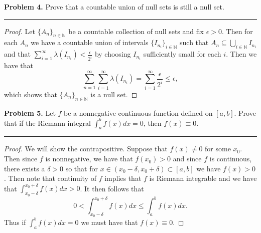 \documentclass[leqno]{article}
\theoremstyle{nonumberplain}
\newtheorem{proof}{Proof}
\newcommand{\N}{\mathbb{N}}
\begin{document}
\pagebreak




\noindent\textbf{Problem 4.} \quad
Prove that a countable union of null sets is still a null set.

\noindent\rule[0.5ex]{\linewidth}{1pt}

\begin{proof}
Let $\{A_n\}_{n\in \N}$ be a countable collection of null sets and fix $\epsilon>0$.  Then for each $A_n$ we have a countable union of intervals $\{I_{n_i}\}_{i\in \N}$ such that $A_n \subseteq \bigcup_{i\in \N} I_{n_i}$ and that $\sum_{i=1}^\infty \lambda\left( I_{n_i} \right) < \frac{\epsilon}{2^i}$ by choosing $I_{n_i}$ sufficiently small for each $i$. Then we have that
\[
\sum_{n=1}^\infty \sum_{i=1}^\infty \lambda \left( I_{n_i} \right) = \sum_{i=1}^\infty \frac{\epsilon}{2^i} \leq \epsilon,
\]
which shows that $\{A_n\}_{n\in \N}$ is a null set.
\end{proof}

\pagebreak



\noindent\textbf{Problem 5.} \quad
Let $f$ be a nonnegative continuous function defined on $[a,b]$. Prove that if the Riemann integral $\int_a^b f(x) dx =0$, then $f(x)\equiv 0$.  

\noindent\rule[0.5ex]{\linewidth}{1pt}

\begin{proof}
We will show the contrapositive.  Suppose that $f(x)\neq 0$ for some $x_0$.  Then since $f$ is nonnegative, we have that $f(x_0)>0$ and since $f$ is continuous, there exists a $\delta>0$ so that for $x \in (x_0-\delta,x_0+\delta)\subset [a,b]$ we have $f(x)>0$.  Then note that continuity of $f$ implies that $f$ is Riemann integrable and we have that $\int_{x_0-\delta}^{x_0+\delta} f(x)dx>0$.  It then follows that
\[
0<\int_{x_0-\delta}^{x_0+\delta} f(x)dx \leq \int_a^b f(x)dx.
\]
Thus if $\int_a^b f(x)dx=0$ we must have that $f(x)\equiv 0$.  
\end{proof}
\end{document}
